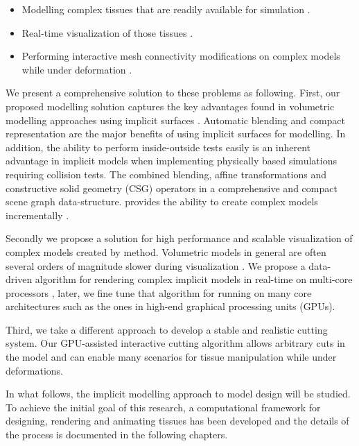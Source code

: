\begin{itemize}
 \item Modelling complex tissues that are readily available for simulation \cite{Nealen2006,Meier2005,Gibson1997a}.
 \item Real-time visualization of those tissues \cite{Mario2010PolygonMesh,Bloomenthal1997}.
 \item Performing interactive mesh connectivity modifications on complex models 
 while under deformation \cite{Jin2013, Wu2011, Courtecuisse2010, Jerabkova2010}. 
\end{itemize}

We present a comprehensive solution to these problems as following. 
First, our proposed modelling solution captures the key advantages found in volumetric modelling approaches using 
implicit surfaces \cite{Bloomenthal1997, Wyvill1986, Wyvill1999, Wyvill1996, Wyvill1997, Schmidt2006, Bernhardt2010}. Automatic blending and compact 
representation are the major benefits of using implicit surfaces for modelling. In addition, the ability to perform inside-outside tests 
easily is an inherent advantage in implicit models when implementing physically based simulations requiring collision tests. 
The \blob \cite{Wyvill1999} combined blending, affine transformations and constructive solid geometry (CSG) operators in a 
comprehensive and compact scene graph data-structure. \blob provides the ability to create complex models incrementally \cite{Schmidt2006}. 

Secondly we propose a solution for high performance and scalable visualization of complex models created by \blob method.
Volumetric models in general are often several orders of magnitude slower during visualization \cite{Bloomenthal1990a, Bloomenthal1997}.
We propose a data-driven algorithm for rendering complex implicit models in real-time on multi-core processors \cite{Shirazian2012}, later, we 
fine tune that algorithm for running on many core architectures such as the ones in high-end graphical processing units (GPUs). 

Third, we take a different approach to develop a stable and realistic cutting system. Our GPU-assisted interactive cutting algorithm allows
arbitrary cuts in the model and can enable many scenarios for tissue manipulation while under deformations. 

In what follows, the implicit modelling approach to model design will be studied. To achieve the initial goal of this research, a
computational framework for designing, rendering and animating tissues has been developed and the details of the process is documented 
in the following chapters. 


